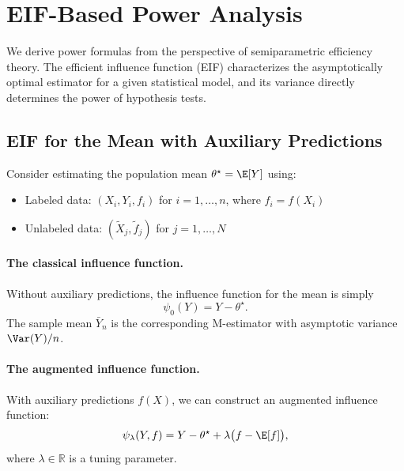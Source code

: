 
\section{EIF-Based Power Analysis}
\label{sec:eif-power}

We derive power formulas from the perspective of semiparametric efficiency theory.
The efficient influence function (EIF) characterizes the asymptotically optimal
estimator for a given statistical model, and its variance directly determines
the power of hypothesis tests.

\subsection{EIF for the Mean with Auxiliary Predictions}

Consider estimating the population mean $\theta^\star = \E[Y]$ using:
\begin{itemize}
    \item Labeled data: $(X_i, Y_i, f_i)$ for $i = 1, \ldots, n$, where $f_i = f(X_i)$
    \item Unlabeled data: $(\widetilde{X}_j, \widetilde{f}_j)$ for $j = 1, \ldots, N$
\end{itemize}

\paragraph{The classical influence function.}
Without auxiliary predictions, the influence function for the mean is simply
\[
\psi_0(Y) = Y - \theta^\star.
\]
The sample mean $\bar{Y}_n$ is the corresponding M-estimator with asymptotic variance $\Var(Y)/n$.

\paragraph{The augmented influence function.}
With auxiliary predictions $f(X)$, we can construct an augmented influence function:
\begin{equation}\label{eq:eif-augmented}
\psi_\lambda(Y, f) = Y - \theta^\star + \lambda\big(f - \E[f]\big),
\end{equation}
where $\lambda \in \mathbb{R}$ is a tuning parameter.

